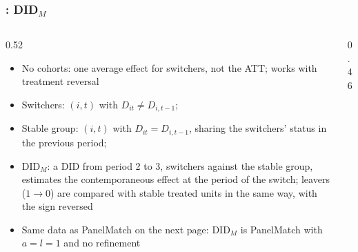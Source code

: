 \documentclass[xcolor=svgnames,9pt,english, aspectratio=169]{beamer}
\newcommand{\gcell}[3]{\fill[#3] ({#1-1},{5-#2}) rectangle ({#1},{6-#2});}
\newcommand{\generalgrid}{%
  \fill[cellC] (0,0) rectangle (6,5);
  \gcell{4}{1}{cellT}\gcell{5}{1}{cellT}
  \gcell{3}{2}{cellT}\gcell{4}{2}{cellT}
  \gcell{5}{3}{cellT}\gcell{6}{3}{cellT}
  \gcell{1}{4}{cellT}\gcell{3}{4}{cellT}}
\newcommand{\gridframerows}{%
  \draw[white, very thin] (0,0) grid (6,5);
  \draw[gray!60, thin] (0,0) rectangle (6,5);
  \foreach \r/\l in {1/A,2/B,3/C,4/D,5/E} {\node[left=2pt] at (0,{5.5-\r}) {\small \l};}}
\begin{document}
\begin{frame}[t]
  \frametitle{\textcite{dechaisemartin2020twoway}: DID\texorpdfstring{$_M$}{M}}
\begin{columns}[T,onlytextwidth]
\begin{column}{0.52\textwidth}
\begin{itemize}\itemsep0.55em
\item<1-> No cohorts: one average effect \alert{for switchers}, not the ATT; works with treatment reversal
\item<2-> Switchers: $(i,t)$ with $D_{it} \neq D_{i,t-1}$; 
\item<3-> Stable group: $(i,t)$ with $D_{it} = D_{i,t-1}$, sharing the switchers' status in the previous period; 
\item<4-> DID$_M$: a DID from period 2 to 3, switchers against the stable group, estimates the \alert{contemporaneous} effect at the period of the switch; leavers ($1 \to 0$) are compared with stable treated units in the same way, with the sign reversed
\item<5-> Same data as PanelMatch on the next page: DID$_M$ is PanelMatch with $a = l = 1$ and no refinement
\end{itemize}
\end{column}
\begin{column}{0.46\textwidth}
\centering
{}
\end{column}
\end{columns}
\end{frame}
\end{document}
